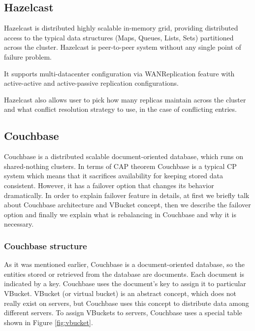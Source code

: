\documentclass[a4paper]{article}
\begin{document}
\subsection{Hazelcast}
Hazelcast is distributed highly scalable in-memory grid, providing distributed access to the typical data structures (Maps, Queues, Lists, Sets) partitioned across the cluster. 
Hazelcast is peer-to-peer system without any single point of failure problem.

It supports multi-datacenter configuration via WANReplication feature with active-active and active-passive replication configurations.

Hazelcast also allows user to pick how many replicas maintain across the cluster and what conflict resolution strategy to use, in the case of conflicting entries.  

\subsection{Couchbase}

Couchbase is a distributed scalable document-oriented database, which runs on shared-nothing clusters.
In terms of CAP theorem Couchbase is a typical CP system which means that it sacrifices availability for keeping stored data consistent.
However, it has a failover option that changes its behavior dramatically. 
In order to explain failover feature in details, at first we briefly talk about Couchbase architecture and VBucket concept, then we describe the failover option and finally we explain what is rebalancing in Couchbase and why it is necessary.


\subsubsection{Couchbase structure}
As it was mentioned earlier, Couchbase is a document-oriented database, so the entities stored or retrieved from the database are documents. 
Each document is indicated by a key.
Couchbase uses the document's key to assign it to particular VBucket. 
VBucket (or virtual bucket) is an abstract concept, which does not really exist on servers, but Couchbase uses this concept to distribute data among different servers. 
To assign VBuckets to servers, Couchbase uses a special table shown in Figure \ref{fig:vbucket}.
\end{document}
